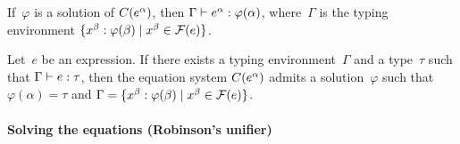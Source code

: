 \begin{prop}
If~$\varphi$ is a solution of $C({e}^{\alpha})$, then
${\Gamma} \vdash {{e}^{\alpha}} : {\varphi(\alpha)}$, where~$\Gamma$ is
the typing environment $\{{x}^{\beta}:\varphi(\beta) \mid
{x}^{\beta} \in \mathcal{F}(e)\}$.
\end{prop}

\begin{prop}
Let~\(e\) be an expression. If there exists a typing
environment~\(\Gamma\) and a type~\(\tau\) such that
${\Gamma} \vdash {e} : {\tau}$, then the equation system $C({e}^{\alpha})$
admits a solution~$\varphi$ such that $\varphi(\alpha) = \tau$ and
$\Gamma = \{{x}^{\beta}:\varphi(\beta) \mid {x}^{\beta} \in
\mathcal{F}(e)\}$.
\end{prop}

\paragraph{Solving the equations (Robinson's unifier)}

